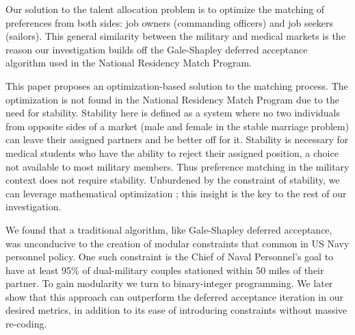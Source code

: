 Our solution to the talent allocation problem is to optimize the matching of preferences from both sides: job owners (commanding officers) and job seekers (sailors). This general similarity between the military and medical  markets is the reason our investigation builds off the Gale-Shapley deferred acceptance algorithm used in the National Residency Match Program. 

This paper proposes an optimization-based solution to the matching process. The optimization is not found in the National Residency Match Program due to the need for stability. Stability here is defined as a system where no two individuals from opposite sides of a market (male and female in the stable marriage problem) can leave their assigned partners and be better off for it. Stability is necessary for  medical students who have the ability to reject their assigned position, a choice not available to most military members. Thus preference matching in the military context does not require stability. Unburdened by the constraint of stability, we can leverage mathematical optimization \citep{1984_Roth} \citep{1985_Roth_b} \citep{1989_Roth}; this insight is the key to the rest of our investigation. 

We found that a traditional algorithm, like Gale-Shapley deferred acceptance, was unconducive to the creation of modular constraints that common in US Navy personnel policy. One such constraint is the Chief of Naval Personnel's goal to have at least 95\% of dual-military couples stationed within 50 miles of their partner. To gain modularity we turn to binary-integer programming.  We later show that this approach can outperform the deferred acceptance iteration in our desired metrics, in addition to its ease of introducing constraints without massive re-coding. 
